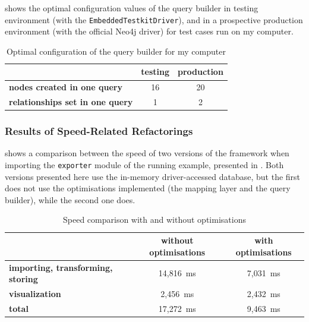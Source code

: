  shows the optimal configuration values of the query builder in testing environment (with the \lstinline{EmbeddedTestkitDriver}), and in a prospective production environment (with the official Neo4j driver) for test cases run on my computer.

\begin{table}[!htb]
	\centering
	\begin{tabular}{l|cc}
		\toprule
																								&   \textbf{testing}   &   \textbf{production}   \\
		\midrule
		\textbf{nodes created in one query}         &   16                 &   20                    \\
		\textbf{relationships set in one query}     &   1                  &   2                     \\
		\bottomrule
	\end{tabular}

	\caption{Optimal configuration of the query builder for my computer}
	\label{table:query-builder-config}
\end{table}


\subsubsection{Results of Speed-Related Refactorings}

 shows a comparison between the speed of two versions of the framework when importing the \lstinline{exporter} module of the running example, presented in . Both versions presented here use the in-memory driver-accessed database, but the first does not use the optimisations implemented (the mapping layer and the query builder), while the second one does.

\begin{table}[!htb]
	\centering
	\begin{tabular}{l|cc}
		\toprule
																								&   \textbf{without optimisations}     &   \textbf{with optimisations}   \\
		\midrule
		\textbf{importing, transforming, storing}   &   14,816~ms                          &   7,031~ms                      \\
		\textbf{visualization}                      &   2,456~ms                           &   2,432~ms                      \\
		\midrule
		\textbf{total}                              &   17,272~ms                          &   9,463~ms                      \\
		\bottomrule
	\end{tabular}

	\caption[Speed comparison with and without optimisations]{Speed comparison with and without optimisations\footnotemark}
	\label{table:results-of-query-optimisations}
\end{table}


